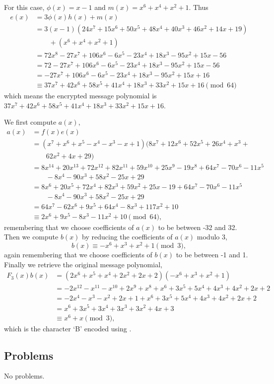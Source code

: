 \begin{questions}
    \item For this case, $\phi(x) = x - 1$ and $m(x) = x^6 + x^4 + x^2 + 1$. Thus
    \begin{align*}
        e(x) &= 3\phi(x)h(x) + m(x) \\
        &= 3(x-1)(24x^7 + 15x^6 + 50x^5 + 48x^4 + 40x^3 + 46x^2 + 14x + 19)\\
        &\quad\quad + (x^6 + x^4 + x^2 + 1)\\
        &= 72x^8 - 27x^7 + 106x^6 - 6x^5 - 23x^4 + 18x^3 - 95x^2 + 15x - 56\\
        &= 72 - 27x^7 + 106x^6 - 6x^5 - 23x^4 + 18x^3 - 95x^2 + 15x - 56\\
        &= -27x^7 + 106x^6 - 6x^5 - 23x^4 + 18x^3 - 95x^2 + 15x + 16\\
        &\equiv 37x^7 + 42x^6 + 58x^5 + 41x^4 + 18x^3 + 33x^2 + 15x + 16 \pmod{64}
    \end{align*}
    which means the encrypted message polynomial is $37x^7 + 42x^6 + 58x^5 + 41x^4 + 18x^3 + 33x^2 + 15x + 16$.

    \item We first compute $a(x)$,
    \begin{align*}
        a(x) &= f(x)e(x)\\
        &= (x^7 +x^6 +x^5 -x^4 -x^3 -x + 1)(8x^7 + 12x^6 + 52x^5 + 26x^4 +x^3 +\\
        &\quad\quad62x^2 + 4x + 29)\\
        &= 8x^{14} + 20x^{13} + 72x^{12} + 82x^{11} + 59x^{10} + 25x^9 - 19x^8 + 64x^7 - 70x^6 - 11x^5\\
        &\quad\quad - 8x^4 - 90x^3 + 58x^2 - 25x + 29\\
        &= 8x^6 + 20x^5 + 72x^4 + 82x^3 + 59x^2 + 25x - 19 + 64x^7 - 70x^6 - 11x^5\\
        &\quad\quad - 8x^4 - 90x^3 + 58x^2 - 25x + 29\\
        &= 64x^7 - 62x^6 + 9x^5 + 64x^4 - 8x^3 + 117x^2 + 10\\
        &\equiv 2x^6 + 9x^5 - 8x^3 - 11x^2 + 10 \pmod{64},
    \end{align*}
    remembering that we choose coefficients of $a(x)$ to be between -32 and 32. Then we compute $b(x)$ by reducing the coefficients of $a(x)$ modulo 3,
    \[
        b(x) \equiv -x^6 + x^3 + x^2 + 1 \pmod{3},
    \]
    again remembering that we choose coefficients of $b(x)$ to be between -1 and 1. Finally we retrieve the original message polynomial,
    \begin{align*}
        F_3(x)b(x) &= (2x^6 +x^5 +x^4 + 2x^2 + 2x + 2)(-x^6 + x^3 + x^2 + 1)\\
        &= -2x^{12} - x^{11} - x^{10} + 2x^9 + x^8 + x^6 + 3x^5 + 5x^4 + 4x^3 + 4x^2 + 2x + 2\\
        &= -2x^4 - x^3 - x^2 + 2x + 1 + x^6 + 3x^5 + 5x^4 + 4x^3 + 4x^2 + 2x + 2\\
        &= x^6 + 3x^5 + 3x^4 + 3x^3 + 3x^2 + 4x + 3\\
        &\equiv x^6 + x \pmod{3},
    \end{align*}
    which is the character `B' encoded using .
\end{questions}

\subsection*{Problems}
No problems.
